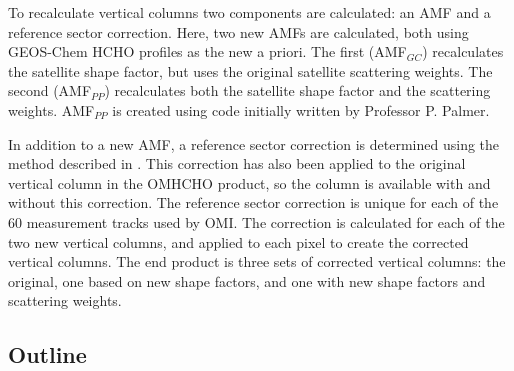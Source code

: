   
  To recalculate vertical columns two components are calculated: an AMF and a reference sector correction.
  Here, two new AMFs are calculated, both using GEOS-Chem HCHO profiles as the new a priori. 
  The first (AMF$_{GC}$) recalculates the satellite shape factor, but uses the original satellite scattering weights.
  The second (AMF$_{PP}$) recalculates both the satellite shape factor and the scattering weights.
  AMF$_{PP}$ is created using code initially written by Professor P. Palmer. %
  
  In addition to a new AMF, a reference sector correction is determined using the method described in \textcite{Abad2016}. %
  This correction has also been applied to the original vertical column in the OMHCHO product, so the column is available with and without this correction.
  The reference sector correction is unique for each of the 60 measurement tracks used by OMI.
  The correction is calculated for each of the two new vertical columns, and applied to each pixel to create the corrected vertical columns. 
  The end product is three sets of corrected vertical columns: the original, one based on new shape factors, and one with new shape factors and scattering weights.
  
  \subsection{Outline}
    \label{Model:omiRecalc:outline}
    
